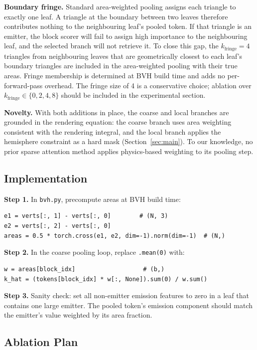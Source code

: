 \documentclass[11pt,letterpaper]{article}
\newcommand{\step}[1]{\textbf{Step #1.}}
\newcommand{\code}[1]{\texttt{#1}}
\begin{document}
\textbf{Boundary fringe.}
Standard area-weighted pooling assigns each triangle to exactly one leaf.
A triangle at the boundary between two leaves therefore contributes nothing
to the neighbouring leaf's pooled token.
If that triangle is an emitter, the block scorer will fail to assign high
importance to the neighbouring leaf, and the selected branch will not
retrieve it.
To close this gap, the $k_{\text{fringe}} = 4$ triangles from neighbouring
leaves that are geometrically closest to each leaf's boundary triangles are
included in the area-weighted pooling with their true areas.
Fringe membership is determined at BVH build time and adds no per-forward-pass
overhead.
The fringe size of 4 is a conservative choice; ablation over
$k_{\text{fringe}} \in \{0, 2, 4, 8\}$ should be included in the
experimental section.

\begin{claimbox}
\textbf{Novelty.} With both additions in place, the coarse and local
branches are grounded in the rendering equation: the coarse branch uses
area weighting consistent with the rendering integral, and the local
branch applies the hemisphere constraint as a hard mask
(Section~\ref{sec:main}).
To our knowledge, no prior sparse attention method applies
physics-based weighting to its pooling step.
\end{claimbox}

\subsection{Implementation}

\step{1} In \code{bvh.py}, precompute areas at BVH build time:
\begin{verbatim}
e1 = verts[:, 1] - verts[:, 0]        # (N, 3)
e2 = verts[:, 2] - verts[:, 0]
areas = 0.5 * torch.cross(e1, e2, dim=-1).norm(dim=-1)  # (N,)
\end{verbatim}

\step{2} In the coarse pooling loop, replace \code{.mean(0)} with:
\begin{verbatim}
w = areas[block_idx]                   # (b,)
k_hat = (tokens[block_idx] * w[:, None]).sum(0) / w.sum()
\end{verbatim}

\step{3} Sanity check: set all non-emitter emission features to zero
in a leaf that contains one large emitter.
The pooled token's emission component should match the emitter's value
weighted by its area fraction.

\subsection{Ablation Plan}
\end{document}
